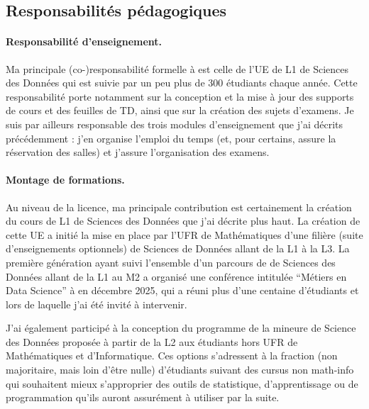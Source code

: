 \subsection{Responsabilités pédagogiques}

\paragraph{Responsabilité d'enseignement.}
Ma principale (co-)responsabilité formelle à \SU est celle de l'UE de L1 de Sciences des Données qui est suivie par un peu plus de 300 étudiants chaque année. Cette responsabilité porte notamment sur la conception et la mise à jour des supports de cours et des feuilles de TD, ainsi que sur la création des sujets d’examens.
Je suis par ailleurs responsable des trois modules d’enseignement que j’ai décrits précédemment : j’en organise l’emploi du temps (et, pour certains, assure la réservation des salles) et j’assure l’organisation des examens.

\paragraph{Montage de formations.}
Au niveau de la licence, ma principale contribution est certainement la création du cours de L1 de Sciences des Données que j’ai décrite plus haut. La création de cette UE a initié la mise en place par l'UFR de Mathématiques d’une filière (suite d'enseignements optionnels) de Sciences de Données allant de la L1 à la L3. La première génération ayant suivi l’ensemble d’un parcours de de Sciences des Données allant de la L1 au M2 a organisé une conférence intitulée “Métiers en Data Science” à \SU en décembre 2025, qui a réuni plus d’une centaine d’étudiants et lors de laquelle j’ai été invité à intervenir.

J’ai également participé à la conception du programme de la mineure de Science des Données proposée à partir de la L2 aux étudiants hors UFR de Mathématiques et d’Informatique. Ces options s’adressent à la fraction (non majoritaire, mais loin d’être nulle) d’étudiants suivant des cursus non math-info qui souhaitent mieux s’approprier des outils de statistique, d’apprentissage ou de programmation qu’ils auront assurément à utiliser par la suite.

